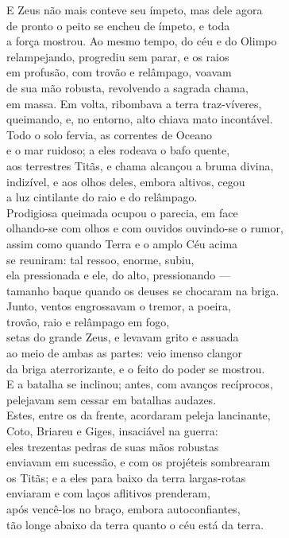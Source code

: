 \begin{pages}
\begin{Rightside}
\quad{}E Zeus não mais conteve seu ímpeto, mas dele agora\\
de pronto o peito se encheu de ímpeto, e toda\\
a força mostrou. Ao mesmo tempo, do céu e do Olimpo\\
relampejando, progrediu sem parar, e os raios \\
em profusão, com trovão e relâmpago, voavam\\
de sua mão robusta, revolvendo a sagrada chama,\\
em massa. Em volta, ribombava a terra traz-víveres,\\
queimando, e, no entorno, alto chiava mato incontável.\\
Todo o solo fervia, as correntes de Oceano \\
e o mar ruidoso; a eles rodeava o bafo quente,\\
aos terrestres Titãs, e chama alcançou a bruma divina,\\
indizível, e aos olhos deles, embora altivos, cegou\\
a luz cintilante do raio e do relâmpago.\\
Prodigiosa queimada ocupou o  parecia, em face\\
olhando-se com olhos e com ouvidos ouvindo-se o rumor,\\
assim como quando Terra e o amplo Céu acima\\
se reuniram: tal ressoo, enorme, subiu,\\
ela pressionada e ele, do alto, pressionando ---\\
tamanho baque quando os deuses se chocaram na briga. \\
Junto, ventos engrossavam o tremor, a poeira,\\
trovão, raio e relâmpago em fogo,\\
setas do grande Zeus, e levavam grito e assuada\\
ao meio de ambas as partes: veio imenso clangor\\
da briga aterrorizante, e o feito do poder se mostrou. \\

\quad{}E a batalha se inclinou; antes, com avanços recíprocos,\\
pelejavam sem cessar em batalhas audazes.\\
Estes, entre os da frente, acordaram peleja lancinante,\\
Coto, Briareu e Giges, insaciável na guerra:\\
eles trezentas pedras de suas mãos robustas \\
enviavam em sucessão, e com os projéteis sombrearam\\
os Titãs; e a eles para baixo da terra largas-rotas\\
enviaram e com laços aflitivos prenderam,\\
após vencê-los no braço, embora autoconfiantes,\\
tão longe abaixo da terra quanto o céu está da terra. \\


\end{Rightside}
\end{pages}
